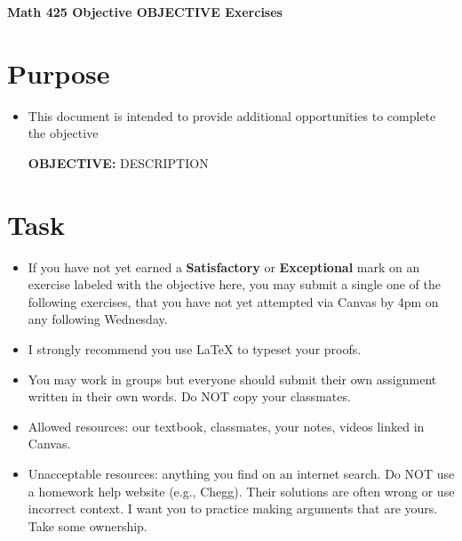 \documentclass[12pt]{article}
\begin{document}
	\begin{center}
		{\Large \bf Math 425 Objective OBJECTIVE Exercises}
	\end{center}
	\section*{Purpose}
	\begin{itemize}
		\item This document is intended to provide additional opportunities to complete the objective
		
		\textbf{OBJECTIVE:} DESCRIPTION
	\end{itemize}
	\section*{Task}
	\begin{itemize}
		\item If you have not yet earned a \textbf{Satisfactory} or \textbf{Exceptional} mark on an exercise labeled with the objective here, you may submit a single one of the following exercises, that you have not yet attempted via Canvas by 4pm on any following Wednesday.
		\item I strongly recommend you use LaTeX to typeset your proofs.
		\item You may work in groups but everyone should submit their own assignment written in their own words.  Do NOT copy your classmates.
		\item Allowed resources: our textbook, classmates, your notes, videos linked in Canvas.
		\item Unacceptable resources: anything you find on an internet search. Do NOT use a homework help website (e.g., Chegg). Their solutions are often wrong or use incorrect context.  I want you to practice making arguments that are yours. Take some ownership.
	\end{itemize}
\end{document}

